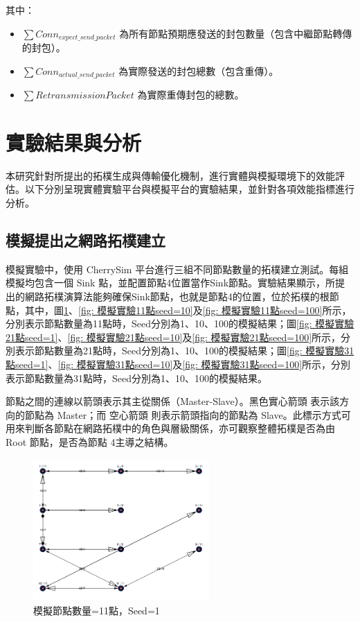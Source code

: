 \begin{ZhChapter}
其中：
\begin{itemize}
    \item $\sum Conn_{expect\_send\_packet}$ 為所有節點預期應發送的封包數量（包含中繼節點轉傳的封包）。
    \item $\sum Conn_{actual\_send\_packet}$ 為實際發送的封包總數（包含重傳）。
    \item $\sum RetransmissionPacket$ 為實際重傳封包的總數。
\end{itemize}

\section{實驗結果與分析}
本研究針對所提出的拓樸生成與傳輸優化機制，進行實體與模擬環境下的效能評估。以下分別呈現實體實驗平台與模擬平台的實驗結果，並針對各項效能指標進行分析。

\subsection{模擬提出之網路拓樸建立}
模擬實驗中，使用 CherrySim 平台進行三組不同節點數量的拓樸建立測試。每組模擬均包含一個 Sink 點，並配置節點4位置當作Sink節點。實驗結果顯示，所提出的網路拓樸演算法能夠確保Sink節點，也就是節點4的位置，位於拓樸的根節點，其中，圖\ref{fig: 模擬實驗11點seed=1}、\ref{fig: 模擬實驗11點seed=10}及\ref{fig: 模擬實驗11點seed=100}所示，分別表示節點數量為11點時，Seed分別為1、10、100的模擬結果；圖\ref{fig: 模擬實驗21點seed=1}、\ref{fig: 模擬實驗21點seed=10}及\ref{fig: 模擬實驗21點seed=100}所示，分別表示節點數量為21點時，Seed分別為1、10、100的模擬結果；圖\ref{fig: 模擬實驗31點seed=1}、\ref{fig: 模擬實驗31點seed=10}及\ref{fig: 模擬實驗31點seed=100}所示，分別表示節點數量為31點時，Seed分別為1、10、100的模擬結果。

節點之間的連線以箭頭表示其主從關係（Master-Slave）。黑色實心箭頭 表示該方向的節點為 Master；而 空心箭頭 則表示箭頭指向的節點為 Slave。此標示方式可用來判斷各節點在網路拓樸中的角色與層級關係，亦可觀察整體拓樸是否為由 Root 節點，是否為節點 4主導之結構。

\begin{figure}[H]
    \centering
    \includegraphics[width = 0.6\textwidth]{image/模擬實驗11點seed=1.png}
    \caption{模擬節點數量=11點，Seed=1}
    \label{fig: 模擬實驗11點seed=1}
\end{figure}


\end{ZhChapter}
